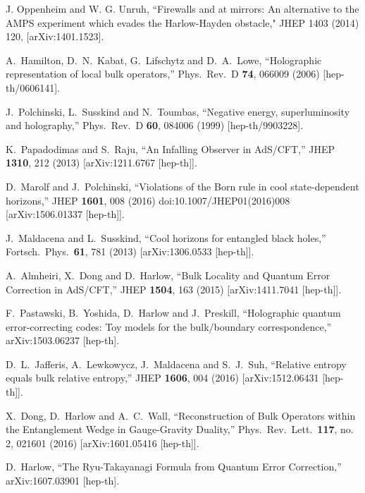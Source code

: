 \documentclass[12pt]{article}
\begin{document}
\begin{thebibliography}{99}
J. Oppenheim and W. G. Unruh, 
``Firewalls and 
at mirrors: An alternative to the
AMPS experiment which evades the Harlow-Hayden obstacle,"
 JHEP 1403 (2014) 120,
[arXiv:1401.1523].

  A.~Hamilton, D.~N.~Kabat, G.~Lifschytz and D.~A.~Lowe,
  ``Holographic representation of local bulk operators,''
  Phys.\ Rev.\ D {\bf 74}, 066009 (2006)
  [hep-th/0606141].

  J.~Polchinski, L.~Susskind and N.~Toumbas,
  ``Negative energy, superluminosity and holography,''
  Phys.\ Rev.\ D {\bf 60}, 084006 (1999)
  [hep-th/9903228].

  K.~Papadodimas and S.~Raju,
  ``An Infalling Observer in AdS/CFT,''
  JHEP {\bf 1310}, 212 (2013)
  [arXiv:1211.6767 [hep-th]].
  
  D.~Marolf and J.~Polchinski,
  ``Violations of the Born rule in cool state-dependent horizons,''
  JHEP {\bf 1601}, 008 (2016)
  doi:10.1007/JHEP01(2016)008
  [arXiv:1506.01337 [hep-th]].
  
  J.~Maldacena and L.~Susskind,
  ``Cool horizons for entangled black holes,''
  Fortsch.\ Phys.\  {\bf 61}, 781 (2013)
   [arXiv:1306.0533 [hep-th]].

  A.~Almheiri, X.~Dong and D.~Harlow,
  ``Bulk Locality and Quantum Error Correction in AdS/CFT,''
  JHEP {\bf 1504}, 163 (2015)
  [arXiv:1411.7041 [hep-th]].
  
  F.~Pastawski, B.~Yoshida, D.~Harlow and J.~Preskill,
  ``Holographic quantum error-correcting codes: Toy models for the bulk/boundary correspondence,''
  arXiv:1503.06237 [hep-th].
  
  D.~L.~Jafferis, A.~Lewkowycz, J.~Maldacena and S.~J.~Suh,
  ``Relative entropy equals bulk relative entropy,''
  JHEP {\bf 1606}, 004 (2016)
  [arXiv:1512.06431 [hep-th]].
  
  X.~Dong, D.~Harlow and A.~C.~Wall,
  ``Reconstruction of Bulk Operators within the Entanglement Wedge in Gauge-Gravity Duality,''
  Phys.\ Rev.\ Lett.\  {\bf 117}, no. 2, 021601 (2016)
  [arXiv:1601.05416 [hep-th]]. 
  
  D.~Harlow,
  ``The Ryu-Takayanagi Formula from Quantum Error Correction,''
  arXiv:1607.03901 [hep-th].


\end{thebibliography}
\end{document}
